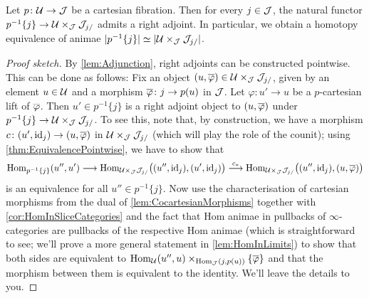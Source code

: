 \begin{lem}\label{lem:CartesianFibres}
	Let $p\colon \mathcal{U}\rightarrow \mathcal{J}$ be a cartesian fibration. Then for every $j\in\mathcal{J}$, the natural functor $p^{-1}\{j\}\rightarrow \mathcal{U}\times_{\mathcal{J}}\mathcal{J}_{j/}$ admits a right adjoint. In particular, we obtain a homotopy equivalence of animae $\mathopen|p^{-1}\{j\}\mathclose|\simeq \mathopen|\mathcal{U}\times_{\mathcal{J}}\mathcal{J}_{j/}\mathclose|$.
\end{lem}
\begin{proof}[Proof sketch]
	By \cref{lem:Adjunction}, right adjoints can be constructed pointwise. This can be done as follows: Fix an object $(u,\ov\varphi)\in \Uu\times_\Jj\Jj_{j/}$, given by an element $u\in \mathcal{U}$ and a morphism $\ov\varphi\colon j\rightarrow p(u)$ in $\mathcal{J}$. Let $\varphi\colon u'\rightarrow u$ be a $p$-cartesian lift of $\ov\varphi$. Then $u'\in p^{-1}\{j\}$ is a right adjoint object to $(u,\ov\varphi)$ under $p^{-1}\{j\}\rightarrow \mathcal{U}\times_{\mathcal{J}}\mathcal{J}_{j/}$. To see this, note that, by construction, we have a morphism $c\colon (u',\id_j)\rightarrow (u,\ov\varphi)$ in $\mathcal{U}\times_{\mathcal{J}}\mathcal{J}_{j/}$ (which will play the role of the counit); using \cref{thm:EquivalencePointwise}, we have to show that
	\begin{equation*}
		\Hom_{p^{-1}\{j\}}\!\left(u'',u'\right)\longrightarrow \Hom_{\Uu\times_\Jj\Jj_{j/}}\lef((u'',\id_j),(u',\id_j)\righ)\overset{c_*}{\longrightarrow}\Hom_{\Uu\times_\Jj\Jj_{j/}}\lef((u'',\id_j),(u,\ov\varphi)\righ)
	\end{equation*}
	is an equivalence for all $u''\in p^{-1}\{j\}$. Now use the characterisation of cartesian morphisms from the dual of \cref{lem:CocartesianMorphisms} together with \cref{cor:HomInSliceCategories} and the fact that Hom animae in pullbacks of $\infty$-categories are pullbacks of the respective Hom animae (which is straightforward to see; we'll prove a more general statement in \cref{lem:HomInLimits}) to show that both sides are equivalent to $\Hom_\Uu(u'',u)\times_{\Hom_\Jj(j,p(u))}\{\ov\varphi\}$ and that the morphism between them is equivalent to the identity. We'll leave the details to you.
\end{proof}

